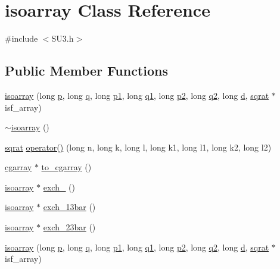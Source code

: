 \hypertarget{classisoarray}{}\section{isoarray Class Reference}
\label{classisoarray}


{\ttfamily \#include $<$S\+U3.\+h$>$}

\subsection*{Public Member Functions}
\begin{DoxyCompactItemize}
\item 
\mbox{\hyperlink{classisoarray_a2255ec3a14431cdc95ea8d0b0150fde6}{isoarray}} (long \mbox{\hyperlink{classisoarray_adeea7560653c9c61f9ec7ca78ec1a43d}{p}}, long \mbox{\hyperlink{classisoarray_a6ba8b815c26280122084ee9754cfd868}{q}}, long \mbox{\hyperlink{classisoarray_a44a74d2c637cd50b4016fb68f469d674}{p1}}, long \mbox{\hyperlink{classisoarray_a49a8c7ad042720ba0f0251f838a81926}{q1}}, long \mbox{\hyperlink{classisoarray_a2c7e4538fd56007f89979d0f1d19f4cf}{p2}}, long \mbox{\hyperlink{classisoarray_a3d08dedb3a7b238fe7a088f8aa54db0b}{q2}}, long \mbox{\hyperlink{classisoarray_af3715f50052bd54b3476e9831fe4d71b}{d}}, \mbox{\hyperlink{classsqrat}{sqrat}} $\ast$isf\+\_\+array)
\item 
\mbox{\hyperlink{classisoarray_ab1ff7ca3e0edb468608b42d2d2aad08b}{$\sim$isoarray}} ()
\item 
\mbox{\hyperlink{classsqrat}{sqrat}} \mbox{\hyperlink{classisoarray_a07114d3b1b8f125d169f10f81884ce16}{operator()}} (long n, long k, long l, long k1, long l1, long k2, long l2)
\item 
\mbox{\hyperlink{classcgarray}{cgarray}} $\ast$ \mbox{\hyperlink{classisoarray_a6af30a576928cf3005c5c6464e64b70e}{to\+\_\+cgarray}} ()
\item 
\mbox{\hyperlink{classisoarray}{isoarray}} $\ast$ \mbox{\hyperlink{classisoarray_acf019b3f53c42d35326ae81399cd556f}{exch\+\_}} ()
\item 
\mbox{\hyperlink{classisoarray}{isoarray}} $\ast$ \mbox{\hyperlink{classisoarray_ac9b13ab94dad05014c087cc89776eeff}{exch\+\_\+13bar}} ()
\item 
\mbox{\hyperlink{classisoarray}{isoarray}} $\ast$ \mbox{\hyperlink{classisoarray_ac6b8d6c435627c589a5bfa9edfa7408d}{exch\+\_\+23bar}} ()
\item 
\mbox{\hyperlink{classisoarray_a2255ec3a14431cdc95ea8d0b0150fde6}{isoarray}} (long \mbox{\hyperlink{classisoarray_adeea7560653c9c61f9ec7ca78ec1a43d}{p}}, long \mbox{\hyperlink{classisoarray_a6ba8b815c26280122084ee9754cfd868}{q}}, long \mbox{\hyperlink{classisoarray_a44a74d2c637cd50b4016fb68f469d674}{p1}}, long \mbox{\hyperlink{classisoarray_a49a8c7ad042720ba0f0251f838a81926}{q1}}, long \mbox{\hyperlink{classisoarray_a2c7e4538fd56007f89979d0f1d19f4cf}{p2}}, long \mbox{\hyperlink{classisoarray_a3d08dedb3a7b238fe7a088f8aa54db0b}{q2}}, long \mbox{\hyperlink{classisoarray_af3715f50052bd54b3476e9831fe4d71b}{d}}, \mbox{\hyperlink{classsqrat}{sqrat}} $\ast$isf\+\_\+array)

\end{DoxyCompactItemize}

